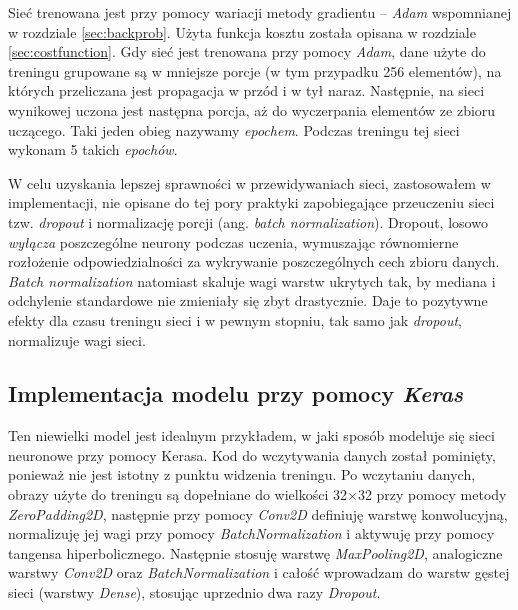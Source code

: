 Sieć trenowana jest przy pomocy wariacji metody gradientu -- \textit{Adam} wspomnianej w rozdziale \ref{sec:backprob}. Użyta
funkcja kosztu została opisana w rozdziale \ref{sec:costfunction}. Gdy sieć
jest trenowana przy pomocy \textit{Adam}, dane użyte do treningu grupowane są w
mniejsze porcje (w tym przypadku 256 elementów), na których przeliczana
jest propagacja w przód i w tył naraz. Następnie, na sieci wynikowej
uczona jest następna porcja, aż do wyczerpania elementów ze zbioru
uczącego. Taki jeden obieg nazywamy \textit{epochem}. Podczas treningu tej sieci
wykonam 5 takich \textit{epochów}.

W celu uzyskania lepszej sprawności w przewidywaniach sieci,
zastosowałem w implementacji, nie opisane do tej pory praktyki
zapobiegające przeuczeniu sieci tzw. \textit{dropout} i normalizację porcji
(ang. \textit{batch normalization}). Dropout, losowo \textit{wyłącza} poszczególne
neurony podczas uczenia, wymuszając równomierne rozłożenie
odpowiedzialności za wykrywanie poszczególnych cech zbioru danych. \textit{Batch
normalization} natomiast skaluje wagi warstw ukrytych tak, by mediana i
odchylenie standardowe nie zmieniały się zbyt drastycznie. Daje to
pozytywne efekty dla czasu treningu sieci i w pewnym stopniu, tak samo
jak \textit{dropout}, normalizuje wagi
sieci.

\subsection{Implementacja modelu przy pomocy \textit{Keras}}

Ten niewielki model jest idealnym przykładem, w jaki sposób modeluje się sieci neuronowe przy pomocy Kerasa. 
Kod do wczytywania danych został pominięty, ponieważ nie jest istotny z punktu widzenia treningu. 
Po wczytaniu danych, obrazy użyte do treningu są dopełniane do wielkości 32\(\times\)32 przy pomocy metody \textit{ZeroPadding2D}, 
następnie przy pomocy \textit{Conv2D} definiuję warstwę konwolucyjną, normalizuję jej wagi przy pomocy \textit{BatchNormalization} i 
aktywuję przy pomocy tangensa hiperbolicznego. Następnie stosuję warstwę \textit{MaxPooling2D}, analogiczne warstwy 
\textit{Conv2D} oraz \textit{BatchNormalization} i całość wprowadzam do warstw gęstej sieci (warstwy \textit{Dense}), stosując uprzednio dwa razy \textit{Dropout}.

